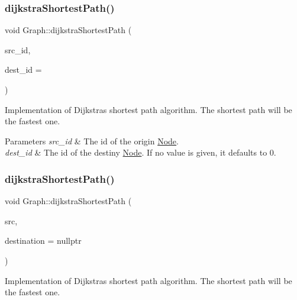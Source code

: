 \subsubsection{\texorpdfstring{dijkstra\+Shortest\+Path()}{dijkstraShortestPath()}\hspace{0.1cm}{\footnotesize\ttfamily [1/4]}}
{\footnotesize\ttfamily void Graph\+::dijkstra\+Shortest\+Path (\begin{DoxyParamCaption}\item[{\hyperlink{_node_8hpp_a9d6265804805c2375068fd7484840dc6}{node\+\_\+id}}]{src\+\_\+id,  }\item[{\hyperlink{_node_8hpp_a9d6265804805c2375068fd7484840dc6}{node\+\_\+id}}]{dest\+\_\+id = {} }\end{DoxyParamCaption})}

Implementation of Dijkstra\textquotesingle{}s shortest path algorithm. The shortest path will be the fastest one.


\begin{DoxyParams}{Parameters}
{\em src\+\_\+id} & The id of the origin \hyperlink{class_node}{Node}. \\
\hline
{\em dest\+\_\+id} & The id of the destiny \hyperlink{class_node}{Node}. If no value is given, it defaults to 0. \\
\hline
\end{DoxyParams}
\hypertarget{class_graph_a0fc41701fa170ab69282ae8a571fdc04}{}\label{class_graph_a0fc41701fa170ab69282ae8a571fdc04} 
\subsubsection{\texorpdfstring{dijkstra\+Shortest\+Path()}{dijkstraShortestPath()}\hspace{0.1cm}{\footnotesize\ttfamily [2/4]}}
{\footnotesize\ttfamily void Graph\+::dijkstra\+Shortest\+Path (\begin{DoxyParamCaption}\item[{\hyperlink{class_node}{Node} $\ast$}]{src,  }\item[{\hyperlink{class_node}{Node} $\ast$}]{destination = {\ttfamily nullptr} }\end{DoxyParamCaption})}

Implementation of Dijkstra\textquotesingle{}s shortest path algorithm. The shortest path will be the fastest one.


